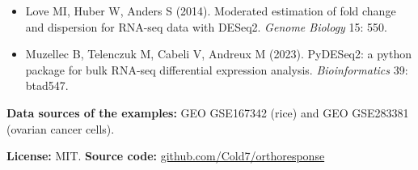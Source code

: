 \documentclass[11pt,a4paper]{article}
\begin{document}
\begin{itemize}
  \item Love MI, Huber W, Anders S (2014). Moderated estimation of fold change and dispersion for RNA-seq
        data with DESeq2. \emph{Genome Biology} 15: 550.
  \item Muzellec B, Telenczuk M, Cabeli V, Andreux M (2023). PyDESeq2: a python package for bulk RNA-seq
        differential expression analysis. \emph{Bioinformatics} 39: btad547.
\end{itemize}

\textbf{Data sources of the examples:} GEO GSE167342 (rice) and GEO GSE283381 (ovarian cancer cells).

\textbf{License:} MIT. \quad \textbf{Source code:}
\href{https://github.com/Cold7/orthoresponse}{github.com/Cold7/orthoresponse}
\end{document}
